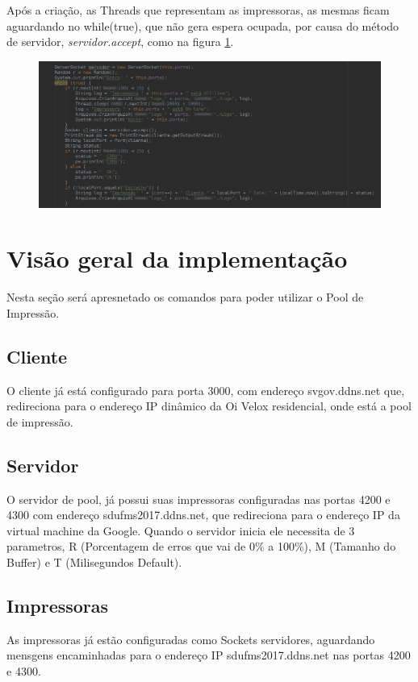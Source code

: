 \documentclass[12pt]{article}
\begin{document}
Após a criação, as Threads que representam as impressoras, as mesmas ficam aguardando no while(true), que não gera espera ocupada, por causa do método de servidor, \textit{servidor.accept}, como na figura  \ref{fig:screenshot003}.
\begin{figure}[h]
	\centering
	\includegraphics[width=1\linewidth]{imagens/screenshot003}
	\caption{}
	\label{fig:screenshot003}
\end{figure}
\section{Visão geral da implementação }
	Nesta seção será apresnetado os comandos para poder utilizar o Pool de Impressão. 
 

\subsection{Cliente}
O cliente já está configurado para porta 3000, com endereço svgov.ddns.net que, redireciona para o endereço IP dinâmico da Oi Velox residencial, onde está a pool de impressão. 
\subsection{Servidor}
O servidor de pool, já possui suas impressoras configuradas nas portas 4200 e 4300 com endereço sdufms2017.ddns.net, que redireciona para o endereço IP da virtual machine da Google. 
Quando o servidor inicia ele necessita de 3 parametros,  R (Porcentagem de erros que vai de 0\% a 100\%), M (Tamanho do Buffer) e T (Milisegundos Default).
\subsection{Impressoras}
As impressoras já estão configuradas como Sockets servidores, aguardando mensgens encaminhadas para o endereço IP sdufms2017.ddns.net nas portas 4200 e 4300.
\end{document}
